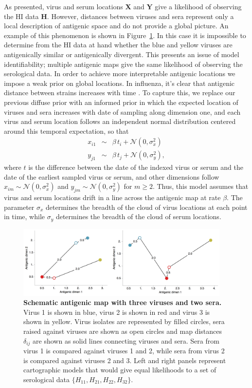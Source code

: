\documentclass[11pt,oneside,letterpaper]{article}
\newcommand{\viruses}{\mathbf{X}}					%
\newcommand{\sera}{\mathbf{Y}}						%
\newcommand{\virussd}{\sigma_x}						%
\newcommand{\serumsd}{\sigma_y}						%
\newcommand{\normal}{\mathcal{N}}					%
\begin{document}
As presented, virus and serum locations $\viruses$ and $\sera$ give a likelihood of observing the HI data $\mathbf{H}$.
However, distances between viruses and sera represent only a local description of antigenic space and do not provide a global picture.
An example of this phenomenon is shown in Figure~\ref{schematic_map}.
In this case it is impossible to determine from the HI data at hand whether the blue and yellow viruses are antigenically similar or antigenically divergent. 
This presents an issue of model identifiability; multiple antigenic maps give the same likelihood of observing the serological data.
In order to achieve more interpretable antigenic locations we impose a weak prior on global locations.
In influenza, it's clear that antigenic distance between strains increases with time \cite{Smith04,Cai10}.
To capture this, we replace our previous diffuse prior with an informed prior in which the expected location of viruses and sera increases with date of sampling along dimension one, and each virus and serum location follows an independent normal distribution centered around this temporal expectation, so that
\begin{eqnarray}
	x_{i1} &\sim& \beta \, t_i + \normal(0, \virussd^2) \nonumber \\
	y_{j1} &\sim& \beta \, t_j + \normal(0, \serumsd^2),
\end{eqnarray}
where $t$ is the difference between the date of the indexed virus or serum and the date of the earliest sampled virus or serum, and other dimensions follow $x_{im} \sim \normal(0, \virussd^2)$ and $y_{jm} \sim \normal(0, \serumsd^2)$ for $m\ge2$.
Thus, this model assumes that virus and serum locations drift in a line across the antigenic map at rate $\beta$.
The parameter $\virussd$ determines the breadth of the cloud of virus locations at each point in time, while $\serumsd$ determines the breadth of the cloud of serum locations.

\begin{figure}[tb]
	\centering		
	\includegraphics[width=0.95\textwidth]{figures/schematic_map}
	\caption{\textbf{Schematic antigenic map with three viruses and two sera.} 
	Virus 1 is shown in blue, virus 2 is shown in red and virus 3 is shown in yellow.
	Virus isolates are represented by filled circles, sera raised against viruses are shown as open circles and map distances $\delta_{ij}$ are shown as solid lines connecting viruses and sera.
	Sera from virus 1 is compared against viruses 1 and 2, while sera from virus 2 is compared against viruses 2 and 3.
	Left and right panels represent cartographic models that would give equal likelihoods to a set of serological data $\{H_{11},H_{21},H_{22},H_{32}\}$.
	} 
	\label{schematic_map} 
\end{figure}
\end{document}
